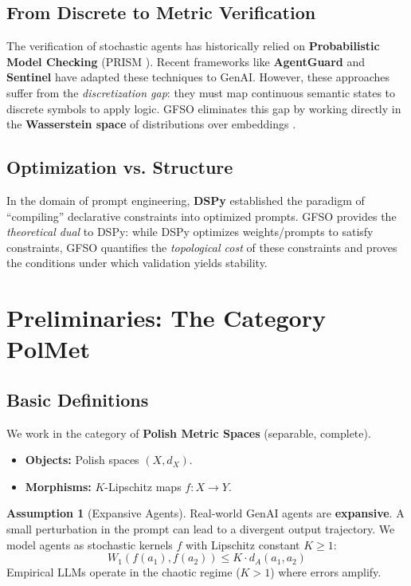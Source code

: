 \documentclass[11pt]{article}
\theoremstyle{definition}
\newtheorem{assumption}[theorem]{Assumption}
\begin{document}
\subsection{From Discrete to Metric Verification}
 The verification of stochastic agents has historically relied on \textbf{Probabilistic Model Checking} (PRISM \cite{kwiatkowska2011}). Recent frameworks like \textbf{AgentGuard} \cite{zhang2025} and \textbf{Sentinel} \cite{liu2025} have adapted these techniques to GenAI. However, these approaches suffer from the \textit{discretization gap}: they must map continuous semantic states to discrete symbols to apply logic. GFSO eliminates this gap by working directly in the \textbf{Wasserstein space} of distributions over embeddings \cite{villani2009, perrone2021}.

\subsection{Optimization vs. Structure}
 In the domain of prompt engineering, \textbf{DSPy} \cite{khattab2024} established the paradigm of ``compiling'' declarative constraints into optimized prompts. GFSO provides the \textit{theoretical dual} to DSPy: while DSPy optimizes weights/prompts to satisfy constraints, GFSO quantifies the \textit{topological cost} of these constraints and proves the conditions under which validation yields stability.

\section{Preliminaries: The Category $\mathbf{PolMet}$}

\subsection{Basic Definitions}
 We work in the category of \textbf{Polish Metric Spaces} (separable, complete).
\begin{itemize}
    \item \textbf{Objects:} Polish spaces $(X, d_X)$.
    \item \textbf{Morphisms:} $K$-Lipschitz maps $f: X \to Y$.
\end{itemize}

\begin{assumption}[Expansive Agents]
 Real-world GenAI agents are \textbf{expansive}. A small perturbation in the prompt can lead to a divergent output trajectory. We model agents as stochastic kernels $f$ with Lipschitz constant $K \ge 1$:
\begin{equation}
 W_1(f(a_1), f(a_2)) \le K \cdot d_A(a_1, a_2)
\end{equation}
Empirical LLMs operate in the chaotic regime ($K > 1$) where errors amplify.
\end{assumption}
\end{document}
